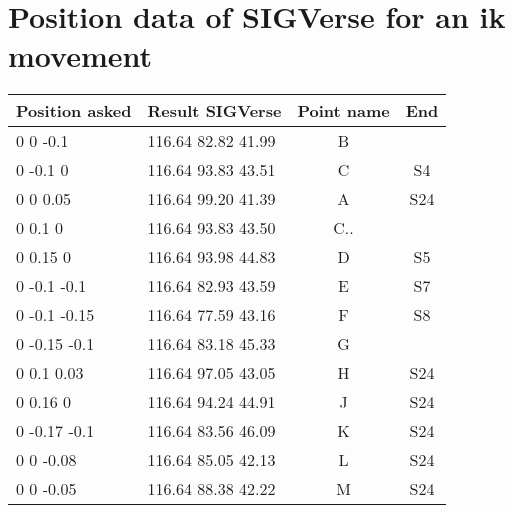 



\section{Position data of SIGVerse for an ik movement}\label{annex:dataPos}
\noindent\begin{minipage}{\linewidth}%
\begin{center}
\begin{tabular}{| l | m{8cm} | c | c |}
\hline
	Position asked & Result SIGVerse & Point name & End\\\hline
	0 0 -0.1 & 116.64 82.82 41.99 & B & \\
	0 -0.1 0 & 116.64 93.83 43.51 & C & S4\\
	0 0 0.05 & 116.64 99.20 41.39 & A & S24\\
	0 0.1 0 & 116.64 93.83 43.50 & C.. &\\
	0 0.15 0 & 116.64 93.98 44.83 & D & S5\\
	0 -0.1 -0.1 & 116.64 82.93 43.59 & E & S7\\
	0 -0.1 -0.15 & 116.64 77.59 43.16 & F & S8 \\
	0 -0.15 -0.1 & 116.64 83.18 45.33 & G &\\
	0 0.1 0.03	& 116.64 97.05 43.05 & H & S24\\
	0 0.16 0 & 116.64 94.24 44.91 & J & S24\\
	0 -0.17 -0.1 & 116.64 83.56 46.09 & K & S24\\
	0 0 -0.08 & 116.64 85.05 42.13 & L & S24\\
	0 0 -0.05 & 116.64 88.38 42.22 & M & S24\\\hline
\end{tabular}
\end{center}
\label{tab:lots}%
\end{minipage}